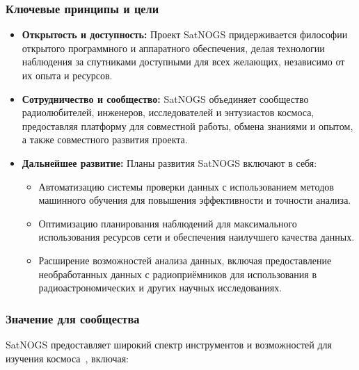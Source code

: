 \documentclass[14pt, a4paper]{extreport}
\begin{document}
    \subsubsection{Ключевые принципы и цели}

    \begin{itemize}
        \item \textbf{Открытость и доступность:} Проект SatNOGS придерживается философии открытого программного и аппаратного обеспечения, делая технологии наблюдения за спутниками доступными для всех желающих, независимо от их опыта и ресурсов.
        \item \textbf{Сотрудничество и сообщество:} SatNOGS объединяет сообщество радиолюбителей, инженеров, исследователей и энтузиастов космоса, предоставляя платформу для совместной работы, обмена знаниями и опытом,  а также совместного развития проекта.
        \item \textbf{Дальнейшее развитие:} Планы развития SatNOGS включают в себя:
        \begin{itemize}
            \item Автоматизацию системы проверки данных с использованием методов машинного обучения для повышения эффективности и точности анализа.
            \item Оптимизацию планирования наблюдений для максимального использования ресурсов сети и обеспечения наилучшего качества данных.
            \item Расширение возможностей анализа данных, включая предоставление необработанных данных с радиоприёмников для использования в радиоастрономических и других научных исследованиях.
        \end{itemize}
    \end{itemize}

    \subsubsection{Значение для сообщества}

    SatNOGS предоставляет широкий спектр инструментов и возможностей для изучения космоса~\cite{satnogs_general_docs},  включая:
\end{document}
